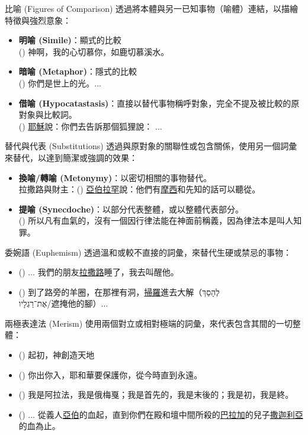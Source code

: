 \documentclass{beamer}
\begin{document}
\begin{frame}{比喻 (Figures of Comparison)}
  透過將本體與另一已知事物（喻體）連結，以描繪特徵與強烈意象：
  \begin{itemize}
    \item\textbf{明喻 (Simile)}：顯式的比較\\
      () 神啊，我的心切慕你，如鹿切慕溪水。
    \item\textbf{暗喻 (Metaphor)}：隱式的比較\\
      () 你們是世上的光。$\dots$
    \item\textbf{借喻 (Hypocatastasis)}：直接以替代事物稱呼對象，完全不提及被比較的原對象與比較詞。\\
      () \uline{耶穌}說：你們去告訴那個狐狸說： $\dots$
  \end{itemize}
\end{frame}

\begin{frame}{替代與代表 (Substitutions)}
  透過與原對象的關聯性或包含關係，使用另一個詞彙來替代，以達到簡潔或強調的效果：
  \begin{itemize}
    \item\textbf{換喻/轉喻 (Metonymy)}：以密切相關的事物替代。\\
      拉撒路與財主：() \uline{亞伯拉罕}說：他們有\uline{摩西}和先知的話可以聽從。
    \item\textbf{提喻 (Synecdoche)}：以部分代表整體，或以整體代表部分。\\
      () 所以凡有血氣的，沒有一個因行律法能在神面前稱義，因為律法本是叫人知罪。
  \end{itemize}
\end{frame}

\begin{frame}{委婉語 (Euphemism)}
  透過溫和或較不直接的詞彙，來替代生硬或禁忌的事物：
  \begin{itemize}
    \item () $\dots$ 我們的朋友\uline{拉撒路}睡了，我去叫醒他。
    \item () 到了路旁的羊圈，在那裡有洞，\uline{掃羅}進去大解（\texthebrew{לְהָסֵךְ אֶת־רַגְלָיו}/遮掩他的腳）$\dots$
  \end{itemize}
\end{frame}

\begin{frame}{兩極表達法 (Merism)}
  使用兩個對立或相對極端的詞彙，來代表包含其間的一切整體：
  \begin{itemize}
    \item () 起初，神創造天地
    \item () 你出你入，耶和華要保護你，從今時直到永遠。
    \item () 我是阿拉法，我是俄梅戛；我是首先的，我是末後的；我是初，我是終。
    \item () $\dots$ 從義人\uline{亞伯}的血起，直到你們在殿和壇中間所殺的\uline{巴拉加}的兒子\uline{撒迦利亞}的血為止。
  \end{itemize}
\end{frame}
\end{document}
